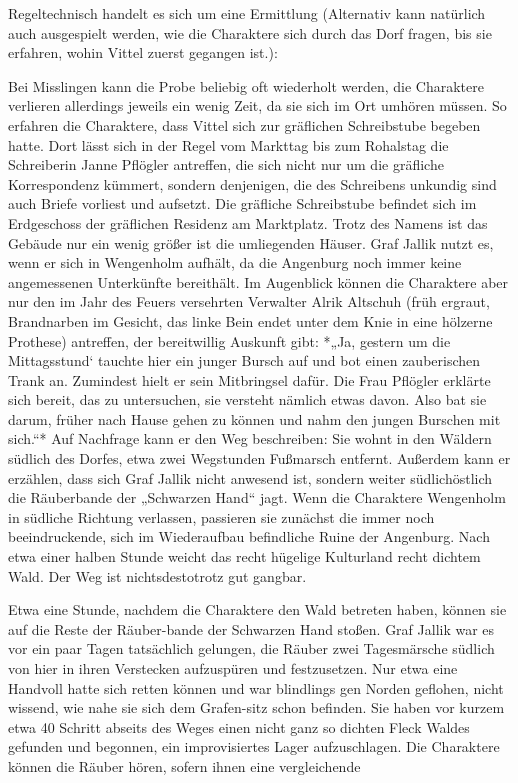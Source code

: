 Regeltechnisch handelt es sich um eine Ermittlung (Alternativ kann natürlich auch ausgespielt werden, wie die Charaktere sich durch das Dorf fragen, bis sie erfahren, wohin Vittel zuerst gegangen ist.):
\platz


\platz
Bei Misslingen kann die Probe beliebig oft wiederholt werden, die Charaktere verlieren allerdings jeweils ein wenig Zeit, da sie sich im Ort umhören müssen. So erfahren die Charaktere, dass Vittel sich zur gräflichen Schreibstube begeben hatte. Dort lässt sich in der Regel vom Markttag bis zum Rohalstag die Schreiberin Janne Pflögler antreffen, die sich nicht nur um die gräfliche Korrespondenz kümmert, sondern denjenigen, die des Schreibens unkundig sind auch Briefe vorliest und aufsetzt. Die gräfliche Schreibstube befindet sich im Erdgeschoss der gräflichen Residenz am Marktplatz. Trotz des Namens ist das Gebäude nur ein wenig größer ist die umliegenden Häuser. Graf Jallik nutzt es, wenn er sich in Wengenholm aufhält, da die Angenburg noch immer keine angemessenen Unterkünfte bereithält. Im Augenblick können die Charaktere aber nur den im Jahr des Feuers versehrten Verwalter Alrik Altschuh (früh ergraut, Brandnarben im Gesicht, das linke Bein endet unter dem Knie in eine hölzerne Prothese) antreffen, der bereitwillig Auskunft gibt: 
*„Ja, gestern um die Mittagsstund‘ tauchte hier ein junger Bursch auf und bot einen zauberischen Trank an. Zumindest hielt er sein Mitbringsel dafür. Die Frau Pflögler erklärte sich bereit, das zu untersuchen, sie versteht nämlich etwas davon. Also bat sie darum, früher nach Hause gehen zu können und nahm den jungen Burschen mit sich.“*
Auf Nachfrage kann er den Weg beschreiben: Sie wohnt in den Wäldern südlich des Dorfes, etwa zwei Wegstunden Fußmarsch entfernt.
Außerdem kann er erzählen, dass sich Graf Jallik nicht anwesend ist, sondern weiter südlichöstlich die Räuberbande der „Schwarzen Hand“ jagt.
\platz
{}
\platz
Wenn die Charaktere Wengenholm in südliche Richtung verlassen, passieren sie zunächst die immer noch beeindruckende, sich im Wiederaufbau befindliche Ruine der Angenburg. Nach etwa einer halben Stunde weicht das recht hügelige Kulturland recht dichtem Wald. Der Weg ist nichtsdestotrotz gut gangbar.

Etwa eine Stunde, nachdem die Charaktere den Wald betreten haben, können sie auf die Reste der Räuber-bande der Schwarzen Hand stoßen. Graf Jallik war es vor ein paar Tagen tatsächlich gelungen, die Räuber zwei Tagesmärsche südlich von hier in ihren Verstecken aufzuspüren und festzusetzen. Nur etwa eine Handvoll hatte sich retten können und war blindlings gen Norden geflohen, nicht wissend, wie nahe sie sich dem Grafen-sitz schon befinden. Sie haben vor kurzem etwa 40 Schritt abseits des Weges einen nicht ganz so dichten Fleck Waldes gefunden und begonnen, ein improvisiertes Lager aufzuschlagen. Die Charaktere können die Räuber hören, sofern ihnen eine vergleichende 
\platz
{}
\platz

